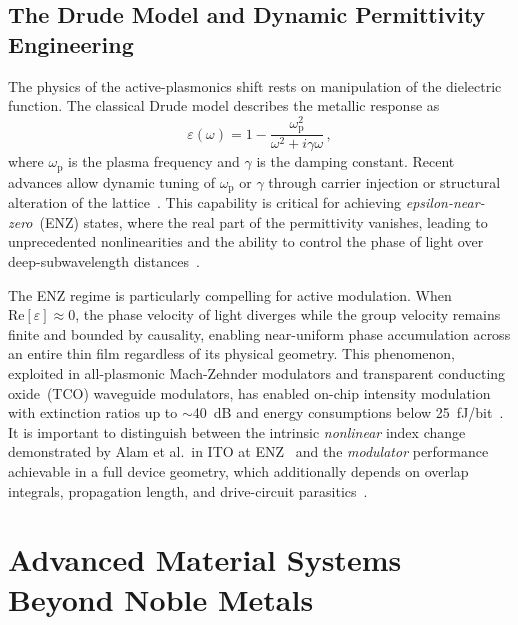 \documentclass[twocolumn,10pt]{article}
\begin{document}
\subsection{The Drude Model and Dynamic Permittivity Engineering}

The physics of the active-plasmonics shift rests on manipulation of the
dielectric function.  The classical Drude model describes the metallic
response as
\begin{equation}
  \varepsilon(\omega) = 1 - \frac{\omega_{\mathrm{p}}^{2}}
                               {\omega^{2} + i\gamma\omega}\,,
  \label{eq:drude}
\end{equation}
where $\omega_{\mathrm{p}}$ is the plasma frequency and $\gamma$ is the
damping constant.  Recent advances allow dynamic tuning of
$\omega_{\mathrm{p}}$ or $\gamma$ through carrier injection or structural
alteration of the lattice~\cite{novotny2012principles,boltasseva2011low}.
This capability is critical for achieving
\textit{epsilon-near-zero}~(ENZ) states, where the real part of the
permittivity vanishes, leading to unprecedented nonlinearities and the
ability to control the phase of light over deep-subwavelength
distances~\cite{alam2016large,liberal2017near}.

The ENZ regime is particularly compelling for active modulation.  When
$\mathrm{Re}[\varepsilon]\!\approx\!0$, the phase velocity of light
diverges while the group velocity remains finite and bounded by
causality, enabling near-uniform phase accumulation across an entire
thin film regardless of its physical geometry.  This phenomenon,
exploited in all-plasmonic Mach-Zehnder modulators and transparent
conducting oxide~(TCO) waveguide modulators, has enabled on-chip
intensity modulation with extinction ratios up to $\sim$40~dB and
energy consumptions below 25~fJ/bit~\cite{haffner2015allplasmonic,alam2016large}.
It is important to distinguish between the intrinsic
\textit{nonlinear} index change demonstrated by Alam et al.\ in ITO at
ENZ~\cite{alam2016large} and the \textit{modulator} performance
achievable in a full device geometry, which additionally depends on
overlap integrals, propagation length, and drive-circuit
parasitics~\cite{haffner2015allplasmonic}.

\section{Advanced Material Systems Beyond Noble Metals}
\label{sec:materials}
\end{document}
